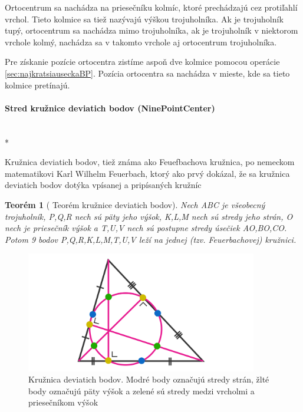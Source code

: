 Ortocentrum sa nachádza na priesečníku kolmíc, ktoré prechádzajú cez protiľahlí vrchol. Tieto kolmice sa tiež nazývajú výškou trojuholníka. 
Ak je trojuholník tupý, ortocentrum sa nachádza mimo trojuholníka, ak je trojuholník v niektorom vrchole kolmý, nachádza sa v takomto vrchole aj ortocentrum trojuholníka.

Pre získanie pozície ortocentra zistíme aspoň dve kolmice pomocou operácie \ref{sec:najkratsiauseckaBP}. Pozícia ortocentra sa nachádza v mieste, kde sa tieto kolmice pretínajú. 


\paragraph{Stred kružnice deviatich bodov (NinePointCenter)}\unskip \mbox{} \\*

Kružnica deviatich bodov, tiež známa ako Feuefbachova kružnica, po nemeckom matematikovi Karl Wilhelm Feuerbach, ktorý ako prvý dokázal, že sa kružnica deviatich bodov dotýka vpísanej a pripísaných kružníc \cite{NinePointTheorem} 


\newtheorem{theorem}{Teorém}
 
\begin{theorem}[{\cite{vyznamne_prvky_trojuholnika} Teorém kružnice deviatich bodov}]
Nech ABC je všeobecný trojuholník, P,Q,R nech sú päty jeho výšok, K,L,M nech sú stredy jeho strán, O nech je priesečník výšok a T,U,V nech sú postupne stredy úsečiek AO,BO,CO. Potom 9 bodov P,Q,R,K,L,M,T,U,V leží na jednej (tzv. Feuerbachovej) kružnici. 

\end{theorem}


\begin{figure}[H]
	\centering
	\includegraphics[width=0.9\textwidth]{obrazky-figures/NinePointCircle.png}
	\caption{Kružnica deviatich bodov. Modré body označujú stredy strán, žlté body označujú päty výšok a zelené sú stredy medzi vrcholmi a priesečníkom výšok\cite{katz_prakash_khim}}
	\label{fig:TriangleCenters_ninePoints}
\end{figure}



